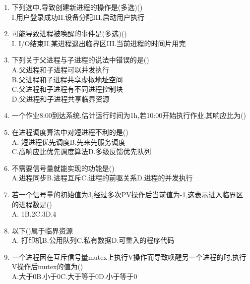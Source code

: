 \documentclass[12pt, a4paper, oneside, UTF8]{ctexbook}
\begin{document}
\begin{enumerate}
    \item 下列选中,导致创建新进程的操作是(多选)() \\
    I.用户登录成功\qquad II.设备分配\qquad III,启动用户执行

    \item 可能导致进程被唤醒的事件是(多选)() \\
    I. I/O结束\qquad II.某进程退出临界区\qquad III.当前进程的时间片用完 

    \item 下列关于父进程与子进程的说法中错误的是() \\
    A.父进程和子进程可以并发执行 \\
    B.父进程和子进程共享虚拟地址空间 \\
    C.父进程和子进程有不同进程控制块 \\
    D.父进程和子进程共享临界资源

    \item 一个作业8:00到达系统,估计运行时间为1h,若10:00开始执行作业,其响应比为()

    \item 在进程调度算法中对短进程不利的是() \\
    A. 短进程优先调度\qquad B.先来先服务调度 \\
    C.高响应比优先调度算法\qquad D.多级反馈优先队列

    \item 不需要信号量就能实现的功能是() \\
    A.进程同步\qquad B.进程互斥\qquad C.进程的前驱关系\qquad D.进程的并发执行

    \item 若一个信号量的初始值为3,经过多次PV操作后当前值为-1,这表示进入临界区的进程数是() \\
    A. 1\qquad B.2\qquad C.3\qquad D.4

    \item 以下()属于临界资源 \\
    A. 打印机\qquad B.公用队列\qquad C.私有数据\qquad D.可重入的程序代码 

    \item 一个进程因在互斥信号量mutex上执行V操作而导致唤醒另一个进程的时,执行V操作后mutex的值为() \\
    A.大于0\qquad B.小于0\qquad C.大于等于0\qquad D.小于等于0 


\end{enumerate}
\end{document}
